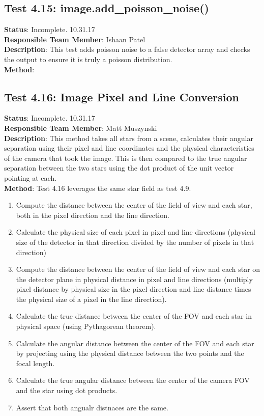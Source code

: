 \documentclass[]{DINOReportMemo}
\begin{document}
\subsection{Test 4.15: image.add\_poisson\_noise()}
\textbf{Status}: Incomplete. 10.31.17\\
\textbf{Responsible Team Member}: Ishaan Patel \\
\textbf{Description}: This test adds poisson noise to a false detector array and checks the output to ensure it is truly a poisson distribution.\\
\textbf{Method}: \\

\subsection{Test 4.16: Image Pixel and Line Conversion}
\textbf{Status}: Incomplete. 10.31.17\\
\textbf{Responsible Team Member}: Matt Muszynski \\
\textbf{Description}: This method takes all stars from a scene, calculates their angular separation using their pixel and line coordinates and the physical characteristics of the camera that took the image. This is then compared to the true angular separation between the two stars using the dot product of the unit vector pointing at each.\\
\textbf{Method}: Test 4.16 leverages the same star field as test 4.9.
\begin{enumerate}
    \item Compute the distance between the center of the field of view and each star, both in the pixel direction and the line direction.
    \item Calculate the physical size of each pixel in pixel and line directions (physical size of the detector in that direction divided by the number of pixels in that direction)
    \item Compute the distance between the center of the field of view and each star on the detector plane in physical distance in pixel and line directions (multiply pixel distance by physical size in the pixel direction and line distance times the physical size of a pixel in the line direction).
    \item Calculate the true distance between the center of the FOV and each star in physical space (using Pythagorean theorem).
    \item Calculate the angular distance between the center of the FOV and each star by projecting using the physical distance between the two points and the focal length.
    \item Calculate the true angular distance between the center of the camera FOV and the star using dot products.
    \item Assert that both angualr distnaces are the same.
\end{enumerate}
\end{document}
